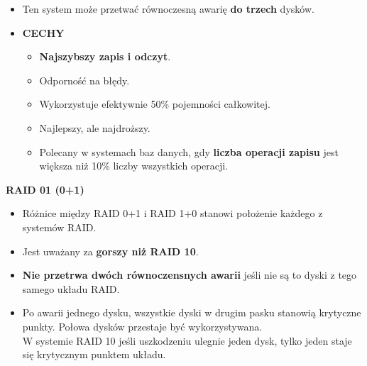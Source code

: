 \documentclass[a5paper,6pt]{article}
\begin{document}
    \begin{itemize}
        \item Ten system może przetwać równoczesną awarię \textbf{do trzech}
              dysków.\\

        \item \textbf{CECHY}
        \begin{itemize}
            \item \textbf{Najszybszy zapis i odczyt}.
            \item Odporność na błędy.
            \item Wykorzystuje efektywnie 50\% pojemności całkowitej.
            \item Najlepszy, ale najdroższy.
            \item Polecany w systemach baz danych, gdy
                  \textbf{liczba operacji zapisu}
                  jest \\większa niż 10\% liczby wszystkich operacji.
        \end{itemize}
    \end{itemize}

    \textbf{RAID 01 (0+1)}
    \begin{itemize}
        \item Różnice między RAID 0+1 i RAID 1+0 stanowi położenie każdego z
              systemów RAID.
        \item Jest uważany za \textbf{gorszy niż RAID 10}.
        \item \textbf{Nie przetrwa dwóch równoczensnych awarii}
              jeśli nie są to dyski z tego samego układu RAID.
        \item Po awarii jednego dysku, wszystkie dyski w drugim pasku stanowią
              krytyczne punkty. Połowa dysków przestaje być wykorzystywana.\\
              W systemie RAID 10 jeśli uszkodzeniu ulegnie jeden dysk, tylko
              jeden staje się krytycznym punktem układu.
    \end{itemize}

    \begin{center}
    \end{center}
\end{document}

